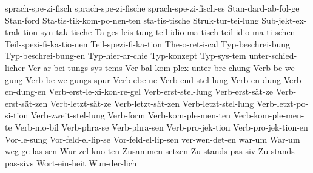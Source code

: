 {sprach-spe-zi-fisch
sprach-spe-zi-fische
sprach-spe-zi-fisch-es
             Stan-dard-ab-fol-ge
Stan-ford
Sta-tis-tik-kom-po-nen-ten
sta-tis-tische
Struk-tur-tei-lung
Sub-jekt-ex-trak-tion
             syn-tak-tische
Ta-ges-leis-tung
teil-idio-ma-tisch
teil-idio-ma-ti-schen
             Teil-spezi-fi-ka-tio-nen
             Teil-spezi-fi-ka-tion
The-o-ret-i-cal
             Typ-beschrei-bung
             Typ-beschrei-bung-en
             Typ-hier-ar-chie
             Typ-konzept
             Typ-sys-tem
	     unter-schied-licher
Ver-ar-bei-tungs-sys-tems
             Ver-bal-kom-plex-unter-bre-chung
Verb-be-we-gung
Verb-be-we-gungs-spur
Verb-ebe-ne
             Verb-end-stel-lung
             Verb-en-dung
             Verb-en-dung-en
Verb-erst-le-xi-kon-re-gel
	     Verb-erst-stel-lung
Verb-erst-sät-ze
Verb-erst-sät-zen
Verb-letzt-sät-ze
Verb-letzt-sät-zen
Verb-letzt-stel-lung
Verb-letzt-po-si-tion
	     Verb-zweit-stel-lung
             Verb-form
             Verb-kom-ple-men-ten
             Verb-kom-ple-men-te
Verb-mo-bil
             Verb-phra-se
             Verb-phra-sen
Verb-pro-jek-tion
Verb-pro-jek-tion-en
             Vor-le-sung
             Vor-feld-el-lip-se
             Vor-feld-el-lip-sen
	     ver-wen-det-en
             war-um
             War-um
weg-ge-las-sen
             Wur-zel-kno-ten
             Zusammen-setzen
             Zu-stands-pas-siv
             Zu-stands-pas-sivs
Wort-ein-heit
Wun-der-lich
}

